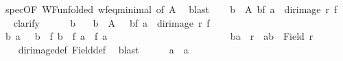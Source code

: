 \begin{isabellebody}
\ spec{\isacharbrackleft}{\kern0pt}OF\ WF{\isacharbrackleft}{\kern0pt}unfolded\ wf{\isacharunderscore}{\kern0pt}eq{\isacharunderscore}{\kern0pt}minimal{}{\isacharbrackright}{\kern0pt}{\isacharcomma}{\kern0pt}\ of\ A{\isacharbrackright}{\kern0pt}\ \isamarkupfalse%
\ blast\isanewline
\ \ \isamarkupfalse%
\ {\isachardoublequoteopen}{\isasymforall}b{\isacharprime}{\kern0pt}\ {\isasymin}\ A{\isacharprime}{\kern0pt}{\isachardot}{\kern0pt}\ {\isacharparenleft}{\kern0pt}b{\isacharprime}{\kern0pt}{\isacharcomma}{\kern0pt}f\ a{\isacharparenright}{\kern0pt}\ {\isasymnotin}\ dir{\isacharunderscore}{\kern0pt}image\ r\ f{\isachardoublequoteclose}\isanewline
\ \ \isamarkupfalse%
{\isacharparenleft}{\kern0pt}clarify{\isacharparenright}{\kern0pt}\isanewline
\ \ \ \ \isamarkupfalse%
\ b{\isacharprime}{\kern0pt}\ \isamarkupfalse%
\ {\isacharasterisk}{\kern0pt}{\isacharcolon}{\kern0pt}\ {\isachardoublequoteopen}b{\isacharprime}{\kern0pt}\ {\isasymin}\ A{\isacharprime}{\kern0pt}{\isachardoublequoteclose}\ \ {\isacharasterisk}{\kern0pt}{\isacharasterisk}{\kern0pt}{\isacharcolon}{\kern0pt}\ {\isachardoublequoteopen}{\isacharparenleft}{\kern0pt}b{\isacharprime}{\kern0pt}{\isacharcomma}{\kern0pt}f\ a{\isacharparenright}{\kern0pt}\ {\isasymin}\ dir{\isacharunderscore}{\kern0pt}image\ r\ f{\isachardoublequoteclose}\isanewline
\ \ \ \ \isamarkupfalse%
\ b{}\ a{}\ \ {}{\isacharcolon}{\kern0pt}\ {\isachardoublequoteopen}b{\isacharprime}{\kern0pt}\ {\isacharequal}{\kern0pt}\ f\ b{}\ {\isasymand}\ f\ a\ {\isacharequal}{\kern0pt}\ f\ a{}{\isachardoublequoteclose}\ \isanewline
\ \ \ \ \ \ \ \ \ \ \ \ \ \ \ \ \ \ \ \ \ \ \ {}{\isacharcolon}{\kern0pt}\ {\isachardoublequoteopen}{\isacharparenleft}{\kern0pt}b{}{\isacharcomma}{\kern0pt}a{}{\isacharparenright}{\kern0pt}\ {\isasymin}\ r\ {\isasymand}\ {\isacharbraceleft}{\kern0pt}a{}{\isacharcomma}{\kern0pt}b{}{\isacharbraceright}{\kern0pt}\ {\isasymle}\ Field\ r{\isachardoublequoteclose}\isanewline
\ \ \ \ \isamarkupfalse%
\ {\isacharasterisk}{\kern0pt}{\isacharasterisk}{\kern0pt}\ \isamarkupfalse%
\ dir{\isacharunderscore}{\kern0pt}image{\isacharunderscore}{\kern0pt}def\ Field{\isacharunderscore}{\kern0pt}def\ \isamarkupfalse%
\ blast\isanewline
\ \ \ \ \isamarkupfalse%
\ {\isachardoublequoteopen}a\ {\isacharequal}{\kern0pt}\ a{}{\isachardoublequoteclose}\ \isamarkupfalse%

\end{isabellebody}
